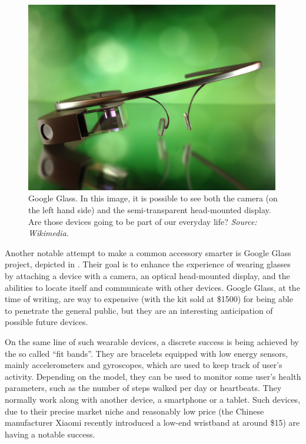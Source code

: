 \documentclass[12pt,a4paper,twoside,openright]{book}
\begin{document}
\begin{figure}
	\centering
	\includegraphics[width=0.99\textwidth]{img/gglass}
	\caption{Google Glass. In this image, it is possible to see both the camera (on the left hand side) and the semi-transparent head-mounted display. Are those devices going to be part of our everyday life? \emph{Source: Wikimedia.}}
	\label{img:gglass}
\end{figure}

Another notable attempt to make a common accessory smarter is Google Glass project, depicted in .
%
Their goal is to enhance the experience of wearing glasses by attaching a device with a camera, an optical head-mounted display, and the abilities to locate itself and communicate with other devices.
%
Google Glass, at the time of writing, are way to expensive (with the kit sold at \$1500) for being able to penetrate the general public, but they are an interesting anticipation of possible future devices.

On the same line of such wearable devices, a discrete success is being achieved by the so called ``fit bands''.
%
They are bracelets equipped with low energy sensors, mainly accelerometers and gyroscopes, which are used to keep track of user's activity.
%
Depending on the model, they can be used to monitor some user's health parameters, such as the number of steps walked per day or heartbeats.
%
They normally work along with another device, a smartphone or a tablet.
%
Such devices, due to their precise market niche and reasonably low price (the Chinese manufacturer Xiaomi recently introduced a low-end wristband at around \$15) are having a notable success.
\end{document}
